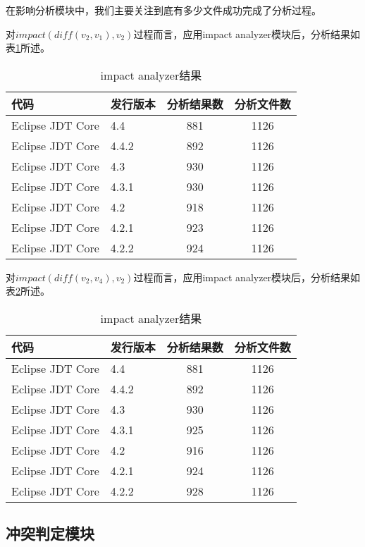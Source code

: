在影响分析模块中，我们主要关注到底有多少文件成功完成了分析过程。

对$impact(diff(v_2,v_1),v_2)$过程而言，应用impact analyzer模块后，分析结果如表\ref {data_impact_1}所述。

\begin{table}[H]
	\caption{impact analyzer结果}
	\label{data_impact_1}
	\centering
	\begin{tabular}{llcc}
		\toprule[1.5pt]
		{\heiti 代码} & {\heiti 发行版本} & {\heiti 分析结果数} & {\heiti 分析文件数} \\\midrule[1pt]
		Eclipse JDT Core & 4.4	 & 881	& 1126\\
		Eclipse JDT Core & 4.4.2 & 892	& 1126 	\\
		Eclipse JDT Core & 4.3	 & 930	& 1126		\\
		Eclipse JDT Core & 4.3.1 & 930	& 1126 	\\
		Eclipse JDT Core & 4.2 	 &	918 & 1126		\\
		Eclipse JDT Core & 4.2.1 & 923	& 1126	\\
		Eclipse JDT Core & 4.2.2  & 924	& 1126	\\
		\bottomrule[1.5pt]
	\end{tabular}
\end{table}

对$impact(diff(v_2,v_4),v_2)$过程而言，应用impact analyzer模块后，分析结果如表\ref {data_impact_2}所述。

\begin{table}[H]
	\caption{impact analyzer结果}
	\label{data_impact_2}
	\centering
	\begin{tabular}{llcc}
		\toprule[1.5pt]
		{\heiti 代码} & {\heiti 发行版本} & {\heiti 分析结果数} & {\heiti 分析文件数} \\\midrule[1pt]
		Eclipse JDT Core & 4.4	 & 881	& 1126\\
		Eclipse JDT Core & 4.4.2 & 892	& 1126 	\\
		Eclipse JDT Core & 4.3	 & 930	& 1126		\\
		Eclipse JDT Core & 4.3.1 & 925	& 1126 	\\
		Eclipse JDT Core & 4.2 	 & 916	& 1126		\\
		Eclipse JDT Core & 4.2.1 	 & 924	& 1126	\\
		Eclipse JDT Core & 4.2.2 	 & 928	& 1126	\\
		\bottomrule[1.5pt]
	\end{tabular}
\end{table}


\subsection{冲突判定模块}


